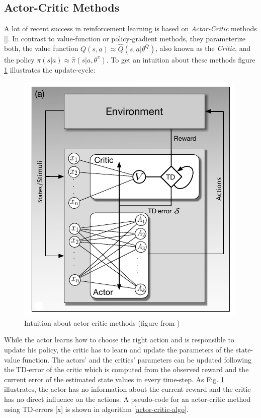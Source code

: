 \subsection{Actor-Critic Methods}
\label{sec:actor-critic}
A lot of recent success in reinforcement learning is based on \textit{Actor-Critic} methods [\cite{konda2000actor}].
In contrast to value-function or policy-gradient methods, they parameterize both, the value function $Q(s,a) \approx \hat{Q}(s,a|\theta^Q)$, also known as the \textit{Critic}, and the policy $\pi(s|a) \approx  \hat{\pi}(s|a,\theta^\pi)$. To get an intuition about these methods figure \ref{fig:actor-critic} illustrates the update-cycle:
\begin{figure}[H]
	\centering
	\includegraphics[width=0.4\linewidth]{actor-critic}
	\caption{Intuition about actor-critic methods (figure from 
	\cite{sutton2018reinforcement})}
	\label{fig:actor-critic}
\end{figure}
While the actor learns how to choose the right action and is responsible to update his policy, the critic has to learn and update the parameters of the state-value function. The actors' and the 
critics' parameters can be updated following the TD-error of the critic which is computed from 
the observed reward and the current error of the estimated state values in every time-step. As Fig. 
\ref{fig:actor-critic} illustrates, the actor has no information about the 
current reward and the critic has no direct influence on the actions.  
A pseudo-code for an actor-critic method using TD-errors [x] is shown in algorithm \ref{actor-critic-algo}.
